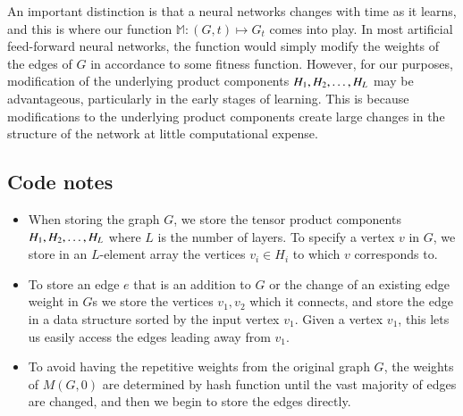 \documentclass{article}
\newcommand{\M}{\mathbb{M}}
\begin{document}
An important distinction is that a neural networks changes with time as it learns, and this is where our function $\M : (G, t) \mapsto G_t$ comes into play. In most artificial feed-forward neural networks, the function would simply modify the weights of the edges of $G$ in accordance to some fitness function. However, for our purposes, modification of the underlying product components $H_1, H_2, \ldots, H_{L}$ may be advantageous, particularly in the early stages of learning. This is because modifications to the underlying product components create large changes in the structure of the network at little computational expense.

\subsection{Code notes} \label{code_outline}
\begin{itemize}
    \item When storing the graph $G$, we store the tensor product components $H_1, H_2, \ldots, H_{L}$ where $L$ is the number of layers. To specify a vertex $v$ in $G$, we store in an $L$-element array the vertices $v_i \in H_i$ to which $v$ corresponds to.

    \item To store an edge $e$ that is an addition to $G$ or the change of an existing edge weight in $G$s we store the vertices $v_1, v_2$ which it connects, and store the edge in a data structure sorted by the input vertex $v_1$. Given a vertex $v_1$, this lets us easily access the edges leading away from $v_1$.

    \item To avoid having the repetitive weights from the original graph $G$, the weights of $M(G,0)$ are determined by hash function until the vast majority of edges are changed, and then we begin to store the edges directly.

\end{itemize}
\end{document}
